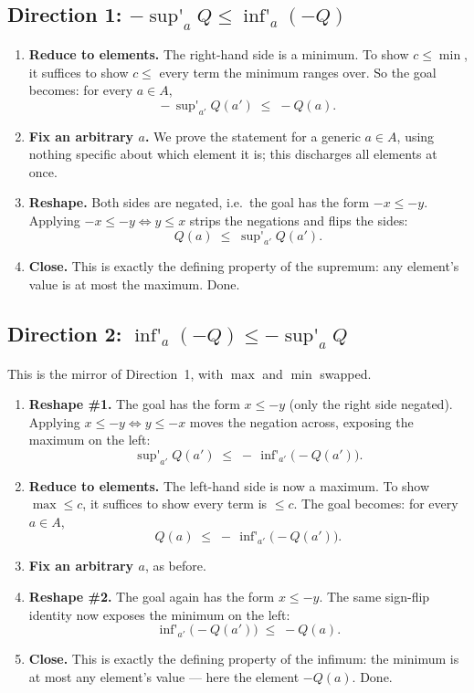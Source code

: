 \documentclass[11pt]{article}
\DeclareMathOperator*{\supp}{sup'}
\DeclareMathOperator*{\infp}{inf'}
\begin{document}
\subsection*{Direction 1: \texorpdfstring{$-\supp_a Q \le \infp_a(-Q)$}{-sup Q <= inf(-Q)}}

\begin{enumerate}
  \item \textbf{Reduce to elements.} The right-hand side is a minimum. To show
    $c \le \min$, it suffices to show $c \le$ every term the minimum ranges over.
    So the goal becomes: for every $a \in A$,
    \[
      -\,\supp_{a'} Q(a') \;\le\; -Q(a).
    \]
  \item \textbf{Fix an arbitrary $a$.} We prove the statement for a generic
    $a \in A$, using nothing specific about which element it is; this discharges
    all elements at once.
  \item \textbf{Reshape.} Both sides are negated, i.e.\ the goal has the form
    $-x \le -y$. Applying $-x \le -y \iff y \le x$ strips the negations and
    flips the sides:
    \[
      Q(a) \;\le\; \supp_{a'} Q(a').
    \]
  \item \textbf{Close.} This is exactly the defining property of the supremum:
    any element's value is at most the maximum. Done.
\end{enumerate}

\subsection*{Direction 2: \texorpdfstring{$\infp_a(-Q) \le -\supp_a Q$}{inf(-Q) <= -sup Q}}

This is the mirror of Direction~1, with $\max$ and $\min$ swapped.

\begin{enumerate}
  \item \textbf{Reshape \#1.} The goal has the form $x \le -y$ (only the right
    side negated). Applying $x \le -y \iff y \le -x$ moves the negation across,
    exposing the maximum on the left:
    \[
      \supp_{a'} Q(a') \;\le\; -\,\infp_{a'}\bigl(-Q(a')\bigr).
    \]
  \item \textbf{Reduce to elements.} The left-hand side is now a maximum. To
    show $\max \le c$, it suffices to show every term is $\le c$. The goal
    becomes: for every $a \in A$,
    \[
      Q(a) \;\le\; -\,\infp_{a'}\bigl(-Q(a')\bigr).
    \]
  \item \textbf{Fix an arbitrary $a$}, as before.
  \item \textbf{Reshape \#2.} The goal again has the form $x \le -y$. The same
    sign-flip identity now exposes the minimum on the left:
    \[
      \infp_{a'}\bigl(-Q(a')\bigr) \;\le\; -Q(a).
    \]
  \item \textbf{Close.} This is exactly the defining property of the infimum:
    the minimum is at most any element's value --- here the element $-Q(a)$.
    Done.
\end{enumerate}
\end{document}
